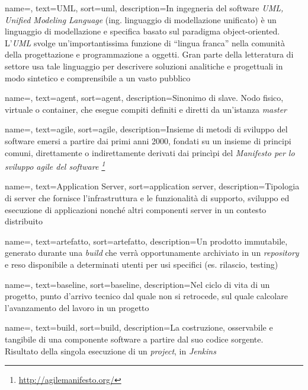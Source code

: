 {
    name=,
    text=UML,
    sort=uml,
    description={In ingegneria del software \emph{UML, Unified Modeling Language} (ing. linguaggio di modellazione unificato) è un linguaggio di modellazione e specifica basato sul paradigma object-oriented. L'\emph{UML} svolge un'importantissima funzione di ``lingua franca'' nella comunità della progettazione e programmazione a oggetti. Gran parte della letteratura di settore usa tale linguaggio per descrivere soluzioni analitiche e progettuali in modo sintetico e comprensibile a un vasto pubblico}
}

{
    name=,
    text=agent,
    sort=agent,
    description={Sinonimo di slave. Nodo fisico, virtuale o container, che esegue compiti definiti e diretti da un'istanza \textit{master}}
}

{
    name=,
    text=agile,
    sort=agile,
    description={Insieme di metodi di sviluppo del software emersi a partire dai primi anni 2000, fondati su un insieme di principi comuni, direttamente o indirettamente derivati dai princìpi del \textit{Manifesto per lo sviluppo agile del software  \footnote{\url{http://agilemanifesto.org/}}}}
}

{
    name=,
    text=Application Server,
    sort=application server,
    description={Tipologia di server che fornisce l'infrastruttura e le funzionalità di supporto, sviluppo ed esecuzione di applicazioni nonché altri componenti server in un contesto distribuito}
}

{
    name=,
    text=artefatto,
    sort=artefatto,
    description={Un prodotto immutabile, generato durante una \textit{build} che verrà opportunamente archiviato in un \textit{repository} e reso disponibile a determinati utenti per usi specifici (es. rilascio, testing)}
}

{
    name=,
    text=baseline,
    sort=baseline,
    description={Nel ciclo di vita di un progetto, punto d'arrivo tecnico dal quale non si retrocede, sul quale calcolare l'avanzamento del lavoro in un progetto}
}

{
    name=,
    text=build,
    sort=build,
    description={La costruzione, osservabile e tangibile di una componente software a partire dal suo codice sorgente.\\ 
    Risultato della singola esecuzione di un \textit{project}, in \textit{Jenkins}}
}

